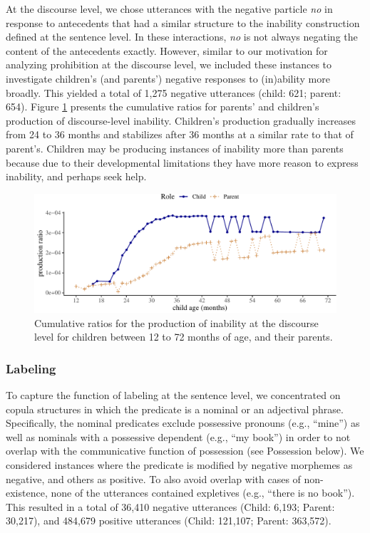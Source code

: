 \documentclass[
  man,floatsintext]{apa6}
\begin{document}
At the discourse level, we chose utterances with the negative particle \emph{no} in response to antecedents that had a similar structure to the inability construction defined at the sentence level. In these interactions, \emph{no} is not always negating the content of the antecedents exactly. However, similar to our motivation for analyzing prohibition at the discourse level, we included these instances to investigate children's (and parents') negative responses to (in)ability more broadly. This yielded a total of 1,275 negative utterances (child: 621; parent: 654). Figure \ref{fig:inabilitydiscourse} presents the cumulative ratios for parents' and children's production of discourse-level inability. Children's production gradually increases from 24 to 36 months and stabilizes after 36 months at a similar rate to that of parent's. Children may be producing instances of inability more than parents because due to their developmental limitations they have more reason to express inability, and perhaps seek help.

\begin{figure}[H]

{\centering \includegraphics{neg_construction_article_files/figure-latex/inabilitydiscourse-1} 

}

\caption{Cumulative ratios for the production of inability at the discourse level for children between 12 to 72 months of age, and their parents.}\label{fig:inabilitydiscourse}
\end{figure}

\hypertarget{labeling}{%
\subsubsection{Labeling}\label{labeling}}

To capture the function of labeling at the sentence level, we concentrated on copula structures in which the predicate is a nominal or an adjectival phrase. Specifically, the nominal predicates exclude possessive pronouns (e.g., ``mine'') as well as nominals with a possessive dependent (e.g., ``my book'') in order to not overlap with the communicative function of possession (see Possession below). We considered instances where the predicate is modified by negative morphemes as negative, and others as positive. To also avoid overlap with cases of non-existence, none of the utterances contained expletives (e.g., ``there is no book''). This resulted in a total of 36,410 negative utterances (Child: 6,193; Parent: 30,217), and 484,679 positive utterances (Child: 121,107; Parent: 363,572).
\end{document}
